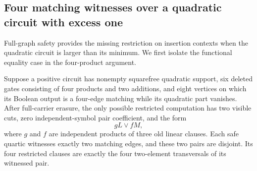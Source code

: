 \subsection{Four matching witnesses over a quadratic circuit with excess one}
Full-graph safety provides the missing restriction on insertion contexts when the quadratic circuit is larger than its minimum. We first isolate the functional equality case in the four-product argument.

\begin{lemma}\label{lem:fourproductalternative}
Suppose a positive circuit has nonempty squarefree quadratic support, six deleted gates consisting of four products and two additions, and eight vertices on which its Boolean output is a four-edge matching while its quadratic part vanishes. After full-carrier erasure, the only possible restricted computation has two visible cuts, zero independent-symbol pair coefficient, and the form
\[
 gL\vee fM,
\]
where $g$ and $f$ are independent products of three old linear clauses. Each safe quartic witnesses exactly two matching edges, and these two pairs are disjoint. Its four restricted clauses are exactly the four two-element transversals of its witnessed pair.
\end{lemma}
